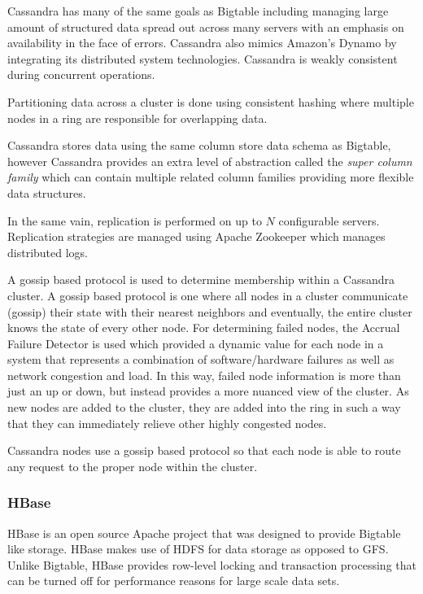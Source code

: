 \documentclass[]{article}
\begin{document}
Cassandra has many of the same goals as Bigtable including managing large amount of structured data spread out across many servers with an emphasis on availability in the face of errors. Cassandra also mimics Amazon's Dynamo by integrating its distributed system technologies\cite{chen_big_2014}. Cassandra is weakly consistent during concurrent operations.

Partitioning data across a cluster is done using consistent hashing where multiple nodes in a ring are responsible for overlapping data.

Cassandra stores data using the same column store data schema as Bigtable, however Cassandra provides an extra level of abstraction called the \textit{super column family} which can contain multiple related column families providing more flexible data structures. 

In the same vain, replication is performed on up to $N$ configurable servers. Replication strategies are managed using Apache Zookeeper which manages distributed logs.

A gossip based protocol is used to determine membership within a Cassandra cluster. A gossip based protocol is one where all nodes in a cluster communicate (gossip) their state with their nearest neighbors and  eventually, the entire cluster knows the state of every other node. For determining failed nodes, the Accrual Failure Detector\cite{hayashibara2004spl} is used which provided a dynamic value for each node in a system that represents a combination of software/hardware failures as well as network congestion and load. In this way, failed node information is more than just an up or down, but instead provides a more nuanced view of the cluster. As new nodes are added to the cluster, they are added into the ring in such a way that they can immediately relieve other highly congested nodes.

Cassandra nodes use a gossip based protocol so that each node is able to route any request to the proper node within the cluster.

\subsubsection{HBase}\label{sssec:hbase}
HBase is an open source Apache project that was designed to provide Bigtable like storage\cite{khetrapal_hbase_2006}. HBase makes use of HDFS for data storage as opposed to GFS. Unlike Bigtable, HBase provides row-level locking and transaction processing that can be turned off for performance reasons for large scale data sets\cite{chen_big_2014}.
\end{document}
